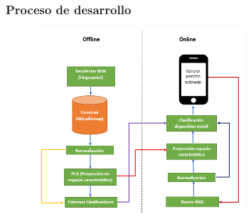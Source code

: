 \documentclass[mathserif]{beamer}
\begin{document}

\begin{frame}
\frametitle{Proceso de desarrollo}

\begin{figure}
\includegraphics[width=0.7\textwidth]{../figures/propuesta_memoria.png}
\end{figure}


\end{frame}
\end{document}
